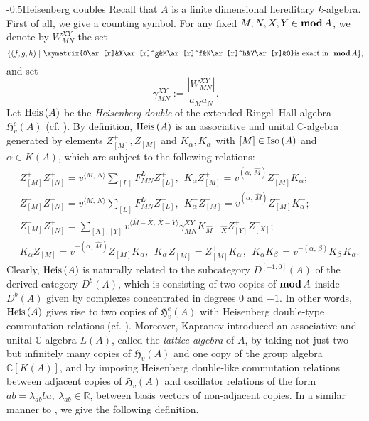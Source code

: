 \documentclass[reqno,12pt]{amsart}
\numberwithin{equation}{section}
\theoremstyle{plain}
\theoremstyle{definition}
\begin{document}
{
  {-\baselineskip}{0.5\baselineskip}{\bf\leftline}}{Heisenberg doubles}
Recall that $A$ is a finite dimensional hereditary $k$-algebra. First of all, we give a counting symbol.
For any fixed $M,N,X,Y\in{\mbox{\rm \textbf{mod}}\,} A$, we denote by $W_{MN}^{XY}$ the set $$\{(f,g,h)~|~\xymatrix{0\ar[r]&X\ar[r]^g&M\ar[r]^f&N\ar[r]^h&Y\ar[r]&0} \text{is exact in}~~{\mbox{\rm \textbf{mod}}\,} A\},$$ and set $$\gamma_{MN}^{XY}:=\frac{|W_{MN}^{XY}|}{a_Ma_N}.$$
Let ${\mbox{\rm Heis}\,}(A)$ be the \emph{Heisenberg double} of the extended Ringel--Hall algebra $\mathfrak{H}_{v}^e(A)$ (cf. \cite[Sec. 1.5]{Kapranov}). By definition, ${\mbox{\rm Heis}\,}(A)$ is an associative and unital $\mathbb{C}$-algebra generated by elements $Z_{[M]}^+, Z_{[M]}^{-}$ and $K_\alpha, K_\alpha^{-}$ with
$[M]\in{\mbox{\rm Iso}\,}(A)$ and $\alpha\in K(A)$, which are subject to the following relations:
\begin{equation*}\begin{split}
&Z_{[M]}^{+}Z_{[N]}^{+}=v^{{\langle {M,\,N}\rangle}}\sum\limits_{[L]}F_{MN}^LZ_{[L]}^{+},~~
K_\alpha Z_{[M]}^{+}=v^{(\alpha,\,\hat{M})}Z_{[M]}^{+}K_\alpha;\\
&Z_{[M]}^{-}Z_{[N]}^{-}=v^{{\langle {M,\,N}\rangle}}\sum\limits_{[L]}F_{MN}^LZ_{[L]}^{-},~~
K_\alpha^- Z_{[M]}^{-}=v^{(\alpha,\,\hat{M})}Z_{[M]}^{-}K_\alpha^-;\\
&Z_{[M]}^{-}Z_{[N]}^{+}=\sum\limits_{[X],[Y]}v^{{\langle {\hat{M}-\hat{X},\,\hat{X}-\hat{Y}}\rangle}}\gamma_{MN}^{XY}K_{\hat{M}-\hat{X}}Z_{[Y]}^{+}Z_{[X]}^{-};\\
&K_\alpha Z_{[M]}^{-}=v^{-(\alpha,\,\hat{M})}Z_{[M]}^{-}K_\alpha,~~K_\alpha^-Z_{[M]}^{+}=Z_{[M]}^{+}K_\alpha^-,~~K_\alpha K_\beta^-=v^{-(\alpha,\,\beta)}K_\beta^-K_\alpha.
\end{split}\end{equation*}
Clearly, ${\mbox{\rm Heis}\,}(A)$ is naturally related to the subcategory $D^{[-1,0]}(A)$ of the derived category $D^b(A)$, which is consisting of two copies of ${\mbox{\rm \textbf{mod}}\,} A$ inside $D^b(A)$ given by complexes concentrated in degrees $0$ and $-1$. In other words, ${\mbox{\rm Heis}\,}(A)$ gives rise to  two copies of $\mathfrak{H}_{v}^e(A)$ with Heisenberg double-type commutation relations (cf. \cite[Prop. 1.5.3]{Kapranov}). Moreover, Kapranov \cite[Def. 3.1]{Kapranov} introduced an associative and unital $\mathbb{C}$-algebra $L(A)$, called the \emph{lattice algebra} of $A$, by taking not just two but infinitely many copies of $\mathfrak{H}_{v}(A)$ and one copy of the group algebra $\mathbb{C}[K(A)]$, and by imposing Heisenberg double-like commutation relations between adjacent copies of $\mathfrak{H}_{v}(A)$ and oscillator relations of the form $ab=\lambda_{ab}ba,~\lambda_{ab}\in\mathbb{R}$, between basis vectors of non-adjacent copies. In a similar manner to \cite[Def. 3.1]{Kapranov}, we give the following definition.
\end{document}
